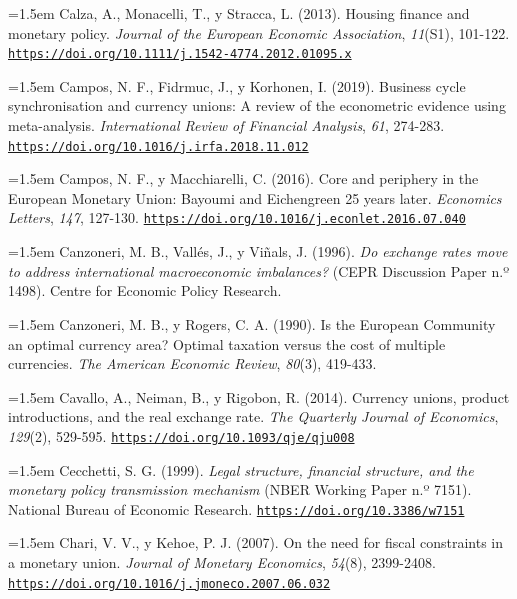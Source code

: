 \documentclass[10pt,a4paper]{article}
\begin{document}
\noindent\hangindent=1.5em Calza, A., Monacelli, T., y Stracca, L. (2013). Housing finance and monetary policy. \textit{Journal of the European Economic Association}, \textit{11}(S1), 101-122. \href{https://doi.org/10.1111/j.1542-4774.2012.01095.x}{\nolinkurl{https://doi.org/10.1111/j.1542-4774.2012.01095.x}}

\noindent\hangindent=1.5em Campos, N. F., Fidrmuc, J., y Korhonen, I. (2019). Business cycle synchronisation and currency unions: A review of the econometric evidence using meta-analysis. \textit{International Review of Financial Analysis}, \textit{61}, 274-283. \href{https://doi.org/10.1016/j.irfa.2018.11.012}{\nolinkurl{https://doi.org/10.1016/j.irfa.2018.11.012}}

\noindent\hangindent=1.5em Campos, N. F., y Macchiarelli, C. (2016). Core and periphery in the European Monetary Union: Bayoumi and Eichengreen 25 years later. \textit{Economics Letters}, \textit{147}, 127-130. \href{https://doi.org/10.1016/j.econlet.2016.07.040}{\nolinkurl{https://doi.org/10.1016/j.econlet.2016.07.040}}

\noindent\hangindent=1.5em Canzoneri, M. B., Vallés, J., y Viñals, J. (1996). \textit{Do exchange rates move to address international macroeconomic imbalances?} (CEPR Discussion Paper n.º 1498). Centre for Economic Policy Research.

\noindent\hangindent=1.5em Canzoneri, M. B., y Rogers, C. A. (1990). Is the European Community an optimal currency area? Optimal taxation versus the cost of multiple currencies. \textit{The American Economic Review}, \textit{80}(3), 419-433.

\noindent\hangindent=1.5em Cavallo, A., Neiman, B., y Rigobon, R. (2014). Currency unions, product introductions, and the real exchange rate. \textit{The Quarterly Journal of Economics}, \textit{129}(2), 529-595. \href{https://doi.org/10.1093/qje/qju008}{\nolinkurl{https://doi.org/10.1093/qje/qju008}}

\noindent\hangindent=1.5em Cecchetti, S. G. (1999). \textit{Legal structure, financial structure, and the monetary policy transmission mechanism} (NBER Working Paper n.º 7151). National Bureau of Economic Research. \href{https://doi.org/10.3386/w7151}{\nolinkurl{https://doi.org/10.3386/w7151}}

\noindent\hangindent=1.5em Chari, V. V., y Kehoe, P. J. (2007). On the need for fiscal constraints in a monetary union. \textit{Journal of Monetary Economics}, \textit{54}(8), 2399-2408. \href{https://doi.org/10.1016/j.jmoneco.2007.06.032}{\nolinkurl{https://doi.org/10.1016/j.jmoneco.2007.06.032}}
\end{document}
